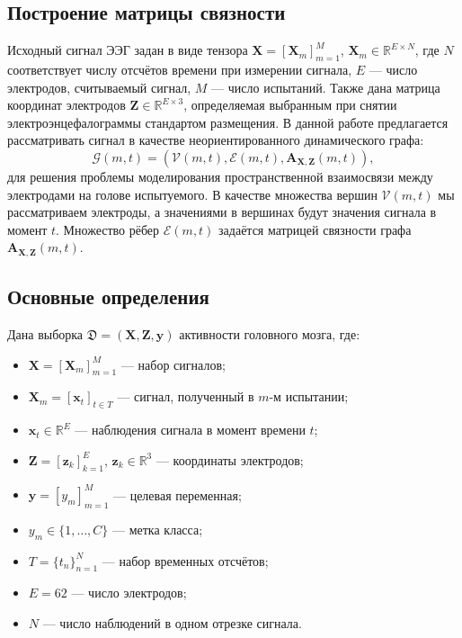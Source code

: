\documentclass[12pt, twoside]{article}
\begin{document}
\subsection{Построение матрицы связности}

Исходный сигнал ЭЭГ задан в виде тензора $\mathbf{X} = [\mathbf{X}_m]_{m=1}^M$, $\mathbf{X}_m \in \mathbb{R}^{E \times N}$, где $N$ соответствует числу отсчётов времени при измерении сигнала, $E$ — число электродов, считываемый сигнал, $M$ — число испытаний. Также дана матрица координат электродов $\mathbf{Z} \in \mathbb{R}^{E \times 3}$, определяемая выбранным при снятии электроэнцефалограммы стандартом размещения. В данной работе предлагается рассматривать сигнал в качестве неориентированного динамического графа: 
\[
\mathcal{G}(m,t) = \left( \mathcal{V}(m,t), \mathcal{E}(m,t), \mathbf{A}_{\mathbf{X},\mathbf{Z}}(m,t) \right),
\]
для решения проблемы моделирования пространственной взаимосвязи между электродами на голове испытуемого. В качестве множества вершин $\mathcal{V}(m,t)$ мы рассматриваем электроды, а значениями в вершинах будут значения сигнала в момент $t$. Множество рёбер $\mathcal{E}(m,t)$ задаётся матрицей связности графа $\mathbf{A}_{\mathbf{X},\mathbf{Z}}(m,t)$.

\subsection{Основные определения}

Дана выборка $\mathfrak{D} = (\mathbf{X}, \mathbf{Z}, \mathbf{y})$ активности головного мозга, где:
\begin{itemize}
    \item $\mathbf{X} = [\mathbf{X}_m]_{m=1}^M$ — набор сигналов;
    \item $\mathbf{X}_m = [\mathbf{x}_t]_{t \in T}$ — сигнал, полученный в $m$-м испытании;
    \item $\mathbf{x}_t \in \mathbb{R}^E$ — наблюдения сигнала в момент времени $t$;
    \item $\mathbf{Z} = [\mathbf{z}_k]_{k=1}^E$, $\mathbf{z}_k \in \mathbb{R}^3$ — координаты электродов;
    \item $\mathbf{y} = [y_m]_{m=1}^M$ — целевая переменная;
    \item $y_m \in \{1, \ldots, C\}$ — метка класса;
    \item $T = \{t_n\}_{n=1}^N$ — набор временных отсчётов;
    \item $E = 62$ — число электродов;
    \item $N$ — число наблюдений в одном отрезке сигнала.
\end{itemize}
\end{document}
